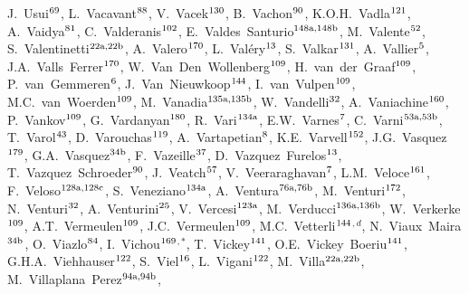 \begin{flushleft}
J.~Usui$^\textrm{\scriptsize 69}$,
L.~Vacavant$^\textrm{\scriptsize 88}$,
V.~Vacek$^\textrm{\scriptsize 130}$,
B.~Vachon$^\textrm{\scriptsize 90}$,
K.O.H.~Vadla$^\textrm{\scriptsize 121}$,
A.~Vaidya$^\textrm{\scriptsize 81}$,
C.~Valderanis$^\textrm{\scriptsize 102}$,
E.~Valdes~Santurio$^\textrm{\scriptsize 148a,148b}$,
M.~Valente$^\textrm{\scriptsize 52}$,
S.~Valentinetti$^\textrm{\scriptsize 22a,22b}$,
A.~Valero$^\textrm{\scriptsize 170}$,
L.~Val\'ery$^\textrm{\scriptsize 13}$,
S.~Valkar$^\textrm{\scriptsize 131}$,
A.~Vallier$^\textrm{\scriptsize 5}$,
J.A.~Valls~Ferrer$^\textrm{\scriptsize 170}$,
W.~Van~Den~Wollenberg$^\textrm{\scriptsize 109}$,
H.~van~der~Graaf$^\textrm{\scriptsize 109}$,
P.~van~Gemmeren$^\textrm{\scriptsize 6}$,
J.~Van~Nieuwkoop$^\textrm{\scriptsize 144}$,
I.~van~Vulpen$^\textrm{\scriptsize 109}$,
M.C.~van~Woerden$^\textrm{\scriptsize 109}$,
M.~Vanadia$^\textrm{\scriptsize 135a,135b}$,
W.~Vandelli$^\textrm{\scriptsize 32}$,
A.~Vaniachine$^\textrm{\scriptsize 160}$,
P.~Vankov$^\textrm{\scriptsize 109}$,
G.~Vardanyan$^\textrm{\scriptsize 180}$,
R.~Vari$^\textrm{\scriptsize 134a}$,
E.W.~Varnes$^\textrm{\scriptsize 7}$,
C.~Varni$^\textrm{\scriptsize 53a,53b}$,
T.~Varol$^\textrm{\scriptsize 43}$,
D.~Varouchas$^\textrm{\scriptsize 119}$,
A.~Vartapetian$^\textrm{\scriptsize 8}$,
K.E.~Varvell$^\textrm{\scriptsize 152}$,
J.G.~Vasquez$^\textrm{\scriptsize 179}$,
G.A.~Vasquez$^\textrm{\scriptsize 34b}$,
F.~Vazeille$^\textrm{\scriptsize 37}$,
D.~Vazquez~Furelos$^\textrm{\scriptsize 13}$,
T.~Vazquez~Schroeder$^\textrm{\scriptsize 90}$,
J.~Veatch$^\textrm{\scriptsize 57}$,
V.~Veeraraghavan$^\textrm{\scriptsize 7}$,
L.M.~Veloce$^\textrm{\scriptsize 161}$,
F.~Veloso$^\textrm{\scriptsize 128a,128c}$,
S.~Veneziano$^\textrm{\scriptsize 134a}$,
A.~Ventura$^\textrm{\scriptsize 76a,76b}$,
M.~Venturi$^\textrm{\scriptsize 172}$,
N.~Venturi$^\textrm{\scriptsize 32}$,
A.~Venturini$^\textrm{\scriptsize 25}$,
V.~Vercesi$^\textrm{\scriptsize 123a}$,
M.~Verducci$^\textrm{\scriptsize 136a,136b}$,
W.~Verkerke$^\textrm{\scriptsize 109}$,
A.T.~Vermeulen$^\textrm{\scriptsize 109}$,
J.C.~Vermeulen$^\textrm{\scriptsize 109}$,
M.C.~Vetterli$^\textrm{\scriptsize 144}$$^{,d}$,
N.~Viaux~Maira$^\textrm{\scriptsize 34b}$,
O.~Viazlo$^\textrm{\scriptsize 84}$,
I.~Vichou$^\textrm{\scriptsize 169}$$^{,*}$,
T.~Vickey$^\textrm{\scriptsize 141}$,
O.E.~Vickey~Boeriu$^\textrm{\scriptsize 141}$,
G.H.A.~Viehhauser$^\textrm{\scriptsize 122}$,
S.~Viel$^\textrm{\scriptsize 16}$,
L.~Vigani$^\textrm{\scriptsize 122}$,
M.~Villa$^\textrm{\scriptsize 22a,22b}$,
M.~Villaplana~Perez$^\textrm{\scriptsize 94a,94b}$,

\end{flushleft}
